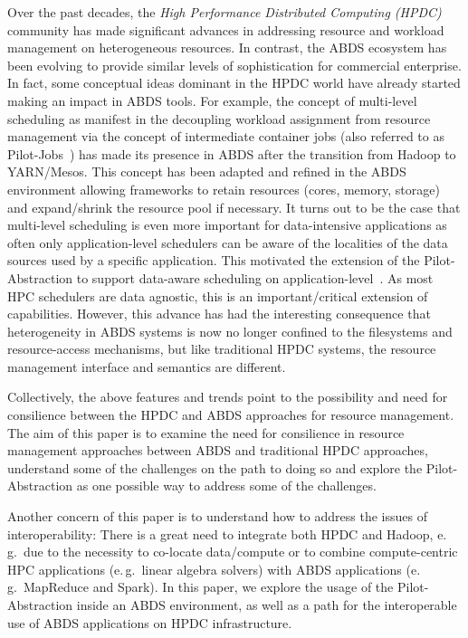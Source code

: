 \documentclass{sig-alternate}
\newcommand{\pilot}{Pilot\xspace}
\newcommand{\pilotjobs}{Pilot-Jobs\xspace}
\begin{document}
Over the past decades, the \emph{High Performance Distributed
  Computing (HPDC)} community has made significant advances in
addressing resource and workload management on heterogeneous
resources. In contrast, the ABDS ecosystem has been evolving to
provide similar levels of sophistication for commercial enterprise.
In fact, some conceptual ideas dominant in the HPDC world have already
started making an impact in ABDS tools. For example, the concept of
multi-level scheduling as manifest in the decoupling workload
assignment from resource management via the concept of intermediate
container jobs (also referred to as \pilotjobs~\cite{pstar12}) has
made its presence in ABDS after the transition from Hadoop to
YARN/Mesos. This concept has been adapted and refined in the ABDS
environment allowing frameworks to retain resources (cores, memory,
storage) and expand/shrink the resource pool if necessary.  It turns
out to be the case that multi-level scheduling is even more important
for data-intensive applications as often only application-level
schedulers can be aware of the localities of the data sources used by
a specific application.  This motivated the extension of the
\pilot-Abstraction to support data-aware scheduling on
application-level~\cite{pilotdata}. As most HPC schedulers are data
agnostic, this is an important/critical extension of capabilities.
However, this advance has had the interesting consequence that
heterogeneity in ABDS systems is now no longer confined to the
filesystems and resource-access mechanisms, but like traditional HPDC
systems, the resource management interface and semantics are
different.

Collectively, the above features and trends point to the possibility
and need for consilience between the HPDC and ABDS approaches for
resource management. The aim of this paper is to examine the need for
consilience in resource management approaches between ABDS and
traditional HPDC approaches, understand some of the challenges on the
path to doing so and explore the \pilot-Abstraction as one possible
way to address some of the challenges.

Another concern of this paper is to understand how to address the issues
of interoperability: There is a great need to integrate both HPDC and
Hadoop, e.\,g.\ due to the necessity to co-locate data/compute or to
combine compute-centric HPC applications (e.\,g.\ linear algebra
solvers) with ABDS applications (e.\,g.\ MapReduce and Spark). In this
paper, we explore the usage of the \pilot-Abstraction inside an ABDS
environment, as well as a path for the interoperable use of ABDS
applications on HPDC infrastructure.
\end{document}
